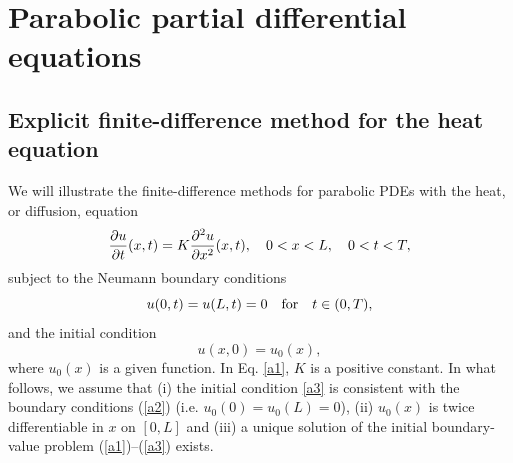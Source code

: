 %
%
%


\section{Parabolic partial differential equations}

\subsection{Explicit finite-difference method for the heat equation}
 
We will illustrate the finite-difference
methods for parabolic PDEs with the heat, or diffusion, equation
\begin{equation}\label{a1}
\frac{{\partial} u}{{\partial} t}(x,t) = K\frac{{\partial}^{2} u}{{\partial} x^{2}}(x,t), \quad
0<x< L, \quad 0 < t < T,
\end{equation}
subject to the Neumann boundary conditions
\begin{equation}\label{a2}
u(0, t) = u(L, t)=0 \quad \hbox{for} \quad t\in (0,T),
\end{equation}
and the initial condition
\begin{equation}\label{a3}
u(x, 0) = u_{0}(x),
\end{equation}
where $u_{0}(x)$ is a given function. In Eq. \eqref{a1}, $K$ is a positive
constant.
In what follows, we assume that (i) the initial condition \eqref{a3} is consistent with
the boundary conditions (\ref{a2}) (i.e. $u_{0}(0)=u_{0}(L)=0$), (ii) $u_{0}(x)$ is twice differentiable in $x$ on $[0,L]$ and (iii) a unique solution of the initial boundary-value problem (\ref{a1})--(\ref{a3}) exists.
 
